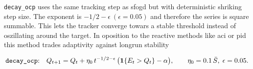 
\texttt{decay\_ocp} \parencite{angelopoulos2024decay} uses the same tracking step as sfogd but with deterministic shriking step size. The exponent is $-1/2 - \epsilon\ (\epsilon = 0.05)$ and therefore the series is square summable. This lets the tracker converge towars a stable threshold instead of oszillating around the target. In oposition to the reactive methods like aci or pid this method trades adaptivity against longrun stability

\begin{equation}
  \text{\texttt{decay\_ocp}:}\quad
  Q_{t+1} = Q_t + \eta_0\, t^{-1/2 - \epsilon}\,
            \big(\mathbf{1}\{E_t > Q_t\} - \alpha\big),
  \qquad \eta_0 = 0.1\,\bar S,\; \epsilon = 0.05 .
  \label{eq:m-decay}
\end{equation}

